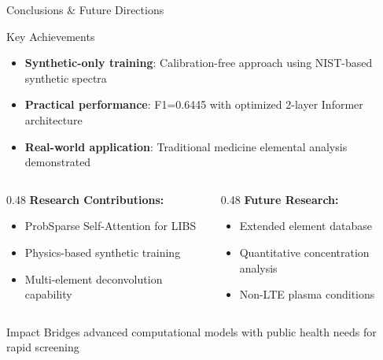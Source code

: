 \documentclass{beamer}
\begin{document}
\begin{frame}{Conclusions \& Future Directions}
  \begin{block}{Key Achievements}
    \begin{itemize}
      \item \textbf{Synthetic-only training}: Calibration-free approach using NIST-based synthetic spectra
      \item \textbf{Practical performance}: F1=0.6445 with optimized 2-layer Informer architecture
      \item \textbf{Real-world application}: Traditional medicine elemental analysis demonstrated
    \end{itemize}
  \end{block}
  
  \vspace{1em}
  
  \begin{columns}[T]
    \begin{column}{0.48\textwidth}
      \textbf{Research Contributions:}
      \begin{itemize}
        \item ProbSparse Self-Attention for LIBS
        \item Physics-based synthetic training
        \item Multi-element deconvolution capability
      \end{itemize}
    \end{column}
    \begin{column}{0.48\textwidth}
      \textbf{Future Research:}
      \begin{itemize}
        \item Extended element database
        \item Quantitative concentration analysis  
        \item Non-LTE plasma conditions
      \end{itemize}
    \end{column}
  \end{columns}
  
  \vspace{1em}
  \begin{alertblock}{Impact}
    Bridges advanced computational models with public health needs for rapid screening
  \end{alertblock}
\end{frame}
\end{document}
